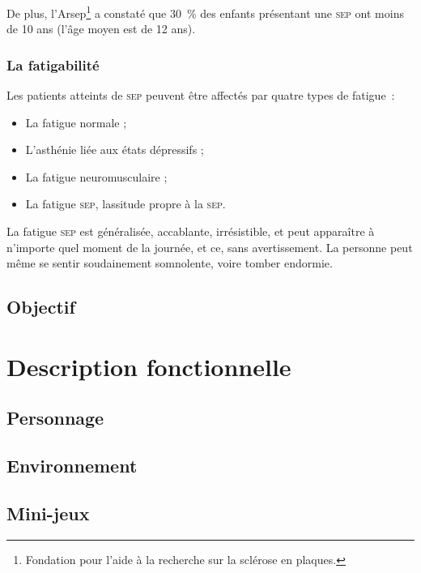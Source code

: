 \documentclass[a4paper,12pt,francais]{article}
\newcommand{\SEP}{\textsc{sep}\xspace}
\begin{document}
De plus, l’Arsep\footnote{Fondation pour l'aide à la recherche sur la sclérose en plaques.} a constaté que 30~\% des enfants présentant une \SEP ont moins de 10 ans (l’âge moyen est de 12 ans).

\subsubsection{La fatigabilité}

Les patients atteints de \SEP peuvent être affectés par quatre types de fatigue~:
\begin{itemize}
\item La fatigue \og normale \fg ;
\item L’asthénie liée aux états dépressifs ;
\item La fatigue neuromusculaire ;
\item La \og fatigue \SEP \fg, lassitude propre à la \SEP.
\end{itemize}

La fatigue \SEP est généralisée, accablante, irrésistible, et peut apparaître à n’importe quel moment de la journée, et ce, sans avertissement. La personne peut même se sentir soudainement somnolente, voire tomber endormie.

\subsection{Objectif}

\section{Description fonctionnelle}

\subsection{Personnage}
\subsection{Environnement}
\subsection{Mini-jeux}
\end{document}
